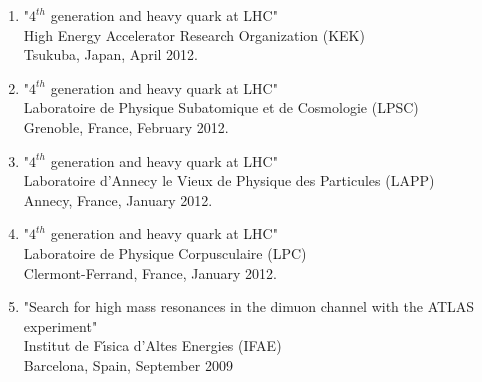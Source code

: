 \documentclass[12pt]{article}
\begin{document}
\begin{enumerate} 

\item "$4^{th}$ generation and heavy quark at LHC"\\
High Energy Accelerator Research Organization (KEK)\\
Tsukuba, Japan, April 2012.

\item "$4^{th}$ generation and heavy quark at LHC"\\
Laboratoire de Physique Subatomique et de Cosmologie (LPSC)\\
Grenoble, France, February 2012.

\item "$4^{th}$ generation and heavy quark at LHC"\\
Laboratoire d'Annecy le Vieux de Physique des Particules (LAPP)\\
Annecy, France, January 2012.

\item "$4^{th}$ generation and heavy quark at LHC"\\
Laboratoire de Physique Corpusculaire (LPC)\\
Clermont-Ferrand, France, January 2012.

\item "Search for high mass resonances in the dimuon channel with the ATLAS experiment"\\
Institut de F\'{\i}sica d'Altes Energies (IFAE)\\
Barcelona, Spain, September 2009

\end{enumerate}
\end{document}

